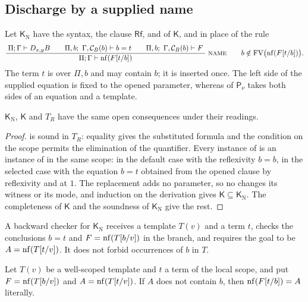 \subsection{Discharge by a supplied name}
\label{wit:sec:name-variant}

Let $\mathsf{K}_{\mathrm N}$ have the syntax, the clause $\mathsf{Rf}$,
 and  of $\mathsf{K}$, and in place of
 the rule
\[
 \infrule{\Pi;\Gamma\proves\D{x}{y}B\qquad
          \Pi,b;\ \Gamma,\mathcal{C}_B(b)\proves b=t\qquad
          \Pi,b;\ \Gamma,\mathcal{C}_B(b)\proves F}
         {\Pi;\Gamma\proves\nf(F[t/b])}\ \rulename{Name}
 \qquad b\notin\FV\bigl(\nf(F[t/b])\bigr).
\]
The term $t$ is over $\Pi,b$ and may contain $b$; it is inserted once.  The
left side of the supplied equation is fixed to the opened parameter, whereas
 of $\mathsf{P}_{\nu}$ takes both sides of an equation
and a template.

\begin{proposition}
\label{wit:prop:name-variant}
$\mathsf{K}_{\mathrm N}$, $\mathsf{K}$ and $T_R$ have the same open
consequences under their readings.
\end{proposition}

\begin{proof}
 is sound in $T_R$: equality gives the substituted formula
and the condition on the scope permits the elimination of the quantifier.
Every instance of  is an instance of  in the
same scope: in the default case with the reflexivity $b=b$, in the selected
case with the equation $b=t$ obtained from the opened clause by reflexivity
and  at $1$.  The replacement adds no parameter, so no
 changes its witness or its mode, and induction on the
derivation gives $\mathsf{K}\subseteq\mathsf{K}_{\mathrm N}$.  The
completeness of $\mathsf{K}$ and the soundness of $\mathsf{K}_{\mathrm N}$
give the rest.
\end{proof}

A backward checker for $\mathsf{K}_{\mathrm N}$ receives a template $T(v)$
and a term $t$, checks the conclusions $b=t$ and $F=\operatorname{nf}(T[b/v])$ in the
branch, and requires the goal to be $A=\operatorname{nf}(T[t/v])$.  It does not forbid
occurrences of $b$ in $T$.

\begin{lemma}
\label{wit:lem:name-template}
Let $T(v)$ be a well-scoped template and $t$ a term of the local scope, and
put $F=\operatorname{nf}(T[b/v])$ and $A=\operatorname{nf}(T[t/v])$.  If $A$ does not contain $b$, then
$\operatorname{nf}(F[t/b])=A$ literally.
\end{lemma}

